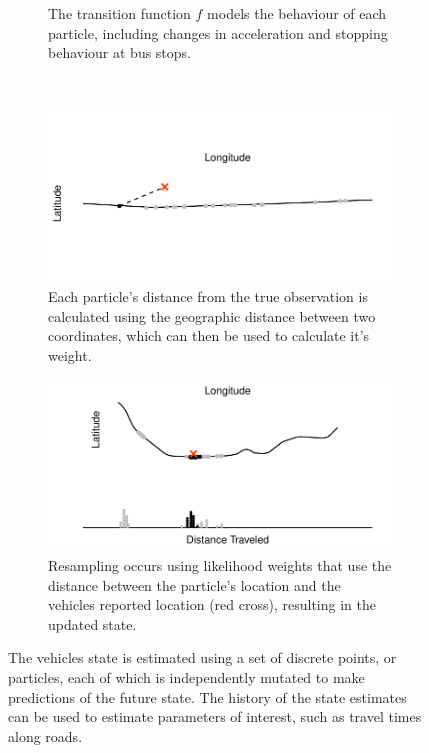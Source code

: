 \begin{figure}[tb]
\begin{subfigure}[t]{0.48\textwidth}
        \caption{The transition function $f$ models the behaviour of each particle,
            including changes in acceleration and stopping behaviour at bus stops.}
        \label{fig:pf_state_predict}
    \end{subfigure}\\
    \begin{subfigure}[t]{0.48\textwidth}
        \centering
        \includegraphics[width=\textwidth]{figures/03_particle_filter_6.pdf}
        \caption{Each particle's distance from the true observation is calculated using
            the geographic distance between two coordinates, which can then be used
            to calculate it's weight.}
        \label{fig:pf_state_update}
    \end{subfigure}\;\;
    \begin{subfigure}[t]{0.48\textwidth}
        \centering
        \includegraphics[width=\textwidth]{figures/03_particle_filter_4.pdf}
        \caption{Resampling occurs using likelihood weights that use the distance
            between the particle's location and the vehicles reported location (red cross),
            resulting in the updated state.}
        \label{fig:pf_state_predict2}
    \end{subfigure}
    \caption{The vehicles state is estimated using a set of discrete points, or particles,
        each of which is independently mutated to make predictions of the future state. The history of the state estimates can be used to estimate parameters of interest, such as
        travel times along roads.}
    \label{fig:pf_state}
\end{figure}




